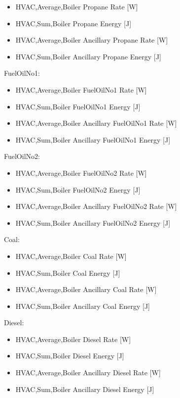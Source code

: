 \begin{itemize}
    \item
    HVAC,Average,Boiler Propane Rate {[}W{]}
    \item
    HVAC,Sum,Boiler Propane Energy {[}J{]}
    \item
    HVAC,Average,Boiler Ancillary Propane Rate {[}W{]}
    \item
    HVAC,Sum,Boiler Ancillary Propane Energy {[}J{]}
\end{itemize}

FuelOilNo1:

\begin{itemize}
    \item
    HVAC,Average,Boiler FuelOilNo1 Rate {[}W{]}
    \item
    HVAC,Sum,Boiler FuelOilNo1 Energy {[}J{]}
    \item
    HVAC,Average,Boiler Ancillary FuelOilNo1 Rate {[}W{]}
    \item
    HVAC,Sum,Boiler Ancillary FuelOilNo1 Energy {[}J{]}
\end{itemize}

FuelOilNo2:

\begin{itemize}
    \item
    HVAC,Average,Boiler FuelOilNo2 Rate {[}W{]}
    \item
    HVAC,Sum,Boiler FuelOilNo2 Energy {[}J{]}
    \item
    HVAC,Average,Boiler Ancillary FuelOilNo2 Rate {[}W{]}
    \item
    HVAC,Sum,Boiler Ancillary FuelOilNo2 Energy {[}J{]}
\end{itemize}

Coal:

\begin{itemize}
    \item
    HVAC,Average,Boiler Coal Rate {[}W{]}
    \item
    HVAC,Sum,Boiler Coal Energy {[}J{]}
    \item
    HVAC,Average,Boiler Ancillary Coal Rate {[}W{]}
    \item
    HVAC,Sum,Boiler Ancillary Coal Energy {[}J{]}
\end{itemize}

Diesel:

\begin{itemize}
    \item
    HVAC,Average,Boiler Diesel Rate {[}W{]}
    \item
    HVAC,Sum,Boiler Diesel Energy {[}J{]}
    \item
    HVAC,Average,Boiler Ancillary Diesel Rate {[}W{]}
    \item
    HVAC,Sum,Boiler Ancillary Diesel Energy {[}J{]}
\end{itemize}

